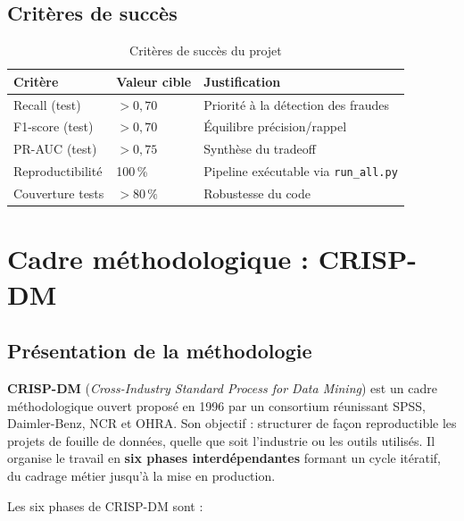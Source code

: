 \subsection{Critères de succès}

\begin{table}[H]
\centering
\caption{Critères de succès du projet}
\label{tab:criteres_succes}
\begin{tabular}{lll}
\toprule
\textbf{Critère} & \textbf{Valeur cible} & \textbf{Justification} \\
\midrule
Recall (test)    & $> 0{,}70$ & Priorité à la détection des fraudes \\
F1-score (test)  & $> 0{,}70$ & Équilibre précision/rappel \\
PR-AUC (test)    & $> 0{,}75$ & Synthèse du tradeoff \\
Reproductibilité & 100\,\%   & Pipeline exécutable via \texttt{run\_all.py} \\
Couverture tests & $> 80\,\%$ & Robustesse du code \\
\bottomrule
\end{tabular}
\end{table}

\section{Cadre méthodologique : CRISP-DM}

\subsection{Présentation de la méthodologie}

\begin{definitionbox}
\textbf{CRISP-DM} (\textit{Cross-Industry Standard Process for Data Mining}) est un cadre
méthodologique ouvert proposé en 1996 par un consortium réunissant SPSS, Daimler-Benz,
NCR et OHRA. Son objectif : structurer de façon reproductible les projets de fouille de
données, quelle que soit l'industrie ou les outils utilisés. Il organise le travail en
\textbf{six phases interdépendantes} formant un cycle itératif, du cadrage métier jusqu'à
la mise en production.
\end{definitionbox}

Les six phases de CRISP-DM sont :

